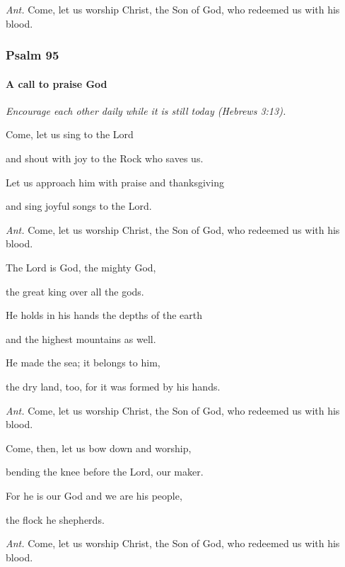 \emph{Ant.} Come, let us worship Christ, the Son of God, who redeemed us with his blood.

\subsubsection{Psalm 95}	\paragraph{A call to praise God}




\vspace{5pt}
\emph{Encourage each other daily while it is still today (Hebrews 3:13).}
\vspace{5pt}

\noindent Come, let us sing to the Lord 

 \noindent  and shout with joy to the Rock who saves us.

\noindent Let us approach him with praise and thanksgiving 

\noindent   and sing joyful songs to the Lord.

\vspace{5pt}
\emph{Ant.} Come, let us worship Christ, the Son of God, who redeemed us with his blood.
\vspace{5pt}

\noindent The Lord is God, the mighty God, 

\noindent   the great king over all the gods.

\noindent He holds in his hands the depths of the earth 

\noindent   and the highest mountains as well.

\noindent He made the sea; it belongs to him, 

\noindent   the dry land, too, for it was formed by his hands.

\vspace{5pt}
\emph{Ant.} Come, let us worship Christ, the Son of God, who redeemed us with his blood.
\vspace{5pt}

\noindent Come, then, let us bow down and worship, 

\noindent   bending the knee before the Lord, our maker.

\noindent For he is our God and we are his people, 

\noindent   the flock he shepherds.

\vspace{5pt}
\emph{Ant.} Come, let us worship Christ, the Son of God, who redeemed us with his blood.
\vspace{5pt}

